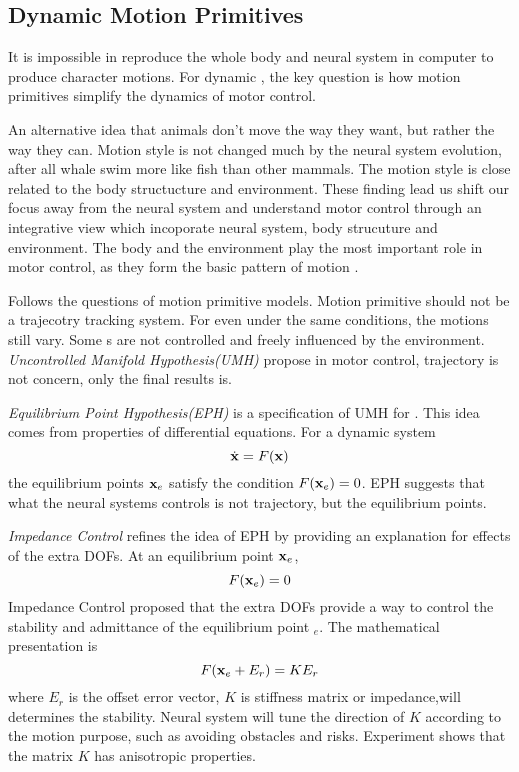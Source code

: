 \subsection{Dynamic Motion Primitives}
It is impossible in reproduce the whole body and neural system in computer to produce character motions.
For dynamic \cms, the key question is how motion primitives simplify the dynamics of motor control.

An alternative idea that animals don’t move the way they want, but rather the way they can. 
Motion style is not changed much by the neural system evolution, after all whale swim more like fish than other mammals.
The motion style is close related to the body structucture and environment.
These finding lead us shift our focus away from the neural system and understand motor control through an integrative view which incoporate neural system, body strucuture and environment\citep{dickinson2000animals}.
The body and the environment play the most important role in motor control, as they form the basic pattern of motion \citep{nishikawa2007neuromechanics}.


Follows the questions of motion primitive models.
Motion primitive should not be a trajecotry tracking system.
For even under the same conditions, the motions still vary. 
Some \dof s are not controlled and freely influenced by the environment. 
\emph{Uncontrolled Manifold Hypothesis(UMH)}\citep{latash2008neurophysiological} propose in motor control, trajectory is not concern, only the final results is.


\emph{Equilibrium Point Hypothesis(EPH)}\citep{Feldman1986} is a specification of UMH for . 
This idea comes from properties of differential equations. 
For a dynamic system
\[
\dot{\mathbf{x}}=F(\mathbf{x})
\]
the equilibrium points $\mathbf{x}_{e}$ satisfy the condition $F(\mathbf{x}_{e})=0$.
EPH suggests that what the neural systems controls is not trajectory, but the equilibrium points.



\emph{Impedance Control} \citep{hogan1985ica} refines the idea of EPH by providing an explanation for effects of the extra DOFs. 
At an equilibrium point $\mathbf{x}_{e}$,
\[
F(\mathbf{x}_{e})=0 
\]
Impedance Control proposed that the extra DOFs provide a way to control the stability and admittance of the equilibrium point $_{e}$. 
The mathematical presentation is
\begin{equation}
F(\mathbf{x}_{e}+E_r)=KE_r
\end{equation}
where $E_r$ is the offset error vector, $K$ is stiffness matrix or impedance,will determines the stability.
Neural system will tune the direction of $K$ according to the motion purpose, such as avoiding obstacles and risks. 
Experiment \citep{Franklin2007} shows that the matrix $K$ has anisotropic properties.







